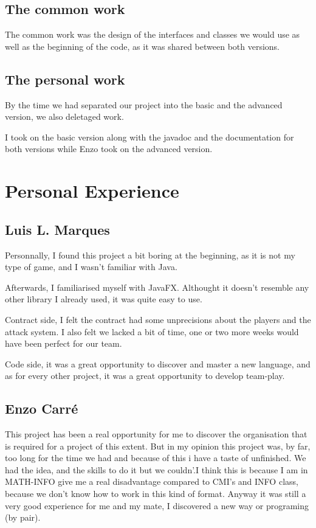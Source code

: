 \documentclass[12pt, a4paper]{report}
\begin{document}
\subsection*{The common work}

The common work was the design of the interfaces and classes we would use as well as the beginning of the code, as it was shared between both versions.

\subsection*{The personal work}

By the time we had separated our project into the basic and the advanced version, we also deletaged work.

I took on the basic version along with the javadoc and the documentation for both versions while Enzo took on the advanced version.

\section*{Personal Experience}

\subsection*{Luis L. Marques}

Personnally, I found this project a bit boring at the beginning, as it is not my type of game, and I wasn't familiar with Java.

Afterwards, I familiarised myself with JavaFX. Althought it doesn't resemble any other library I already used, it was quite easy to use.

Contract side, I felt the contract had some unprecisions about the players and the attack system. I also felt we lacked a bit of time, one or two more weeks would have been perfect for our team.

Code side, it was a great opportunity to discover and master a new language, and as for every other project, it was a great opportunity to develop team-play.

\subsection*{Enzo Carré}

This project has been a real opportunity for me to discover the organisation that is required for a project of this extent. But in my opinion this project was, by far, too long for the time we had and because of this i have a taste of unfinished. We had the idea, and the skills to do it but we couldn’.I think this is because I am in MATH-INFO give me a real disadvantage compared to CMI’s and INFO class, because we don’t know how to work in this kind of format. Anyway it was still a very good experience for me and my mate, I discovered a new way or programing (by pair). 
\end{document}

